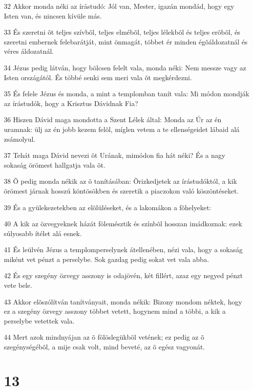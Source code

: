 \par 32 Akkor monda néki az írástudó: Jól van, Mester, igazán mondád, hogy egy Isten van, és nincsen kívüle más.
\par 33 És szeretni õt teljes szívbõl, teljes elmébõl, teljes lélekbõl és teljes erõbõl, és szeretni embernek felebarátját, mint önmagát, többet ér minden égõáldozatnál és véres áldozatnál.
\par 34 Jézus pedig látván, hogy bölcsen felelt vala, monda néki: Nem messze vagy az Isten országától. És többé senki sem meri vala õt megkérdezni.
\par 35 És felele Jézus és monda, a mint a templomban tanít vala: Mi módon mondják az írástudók, hogy a Krisztus Dávidnak Fia?
\par 36 Hiszen Dávid maga mondotta a  Szent Lélek által: Monda az Úr az én uramnak: ülj az én jobb kezem felõl, míglen vetem a te ellenségeidet lábaid alá zsámolyul.
\par 37 Tehát maga Dávid nevezi õt Urának, mimódon fia hát néki? És a nagy sokaság örömest hallgatja vala õt.
\par 38 Õ pedig monda nékik az õ tanításában: Õrizkedjetek az írástudóktól, a kik örömest járnak hosszú köntösökben és szeretik a piaczokon való köszöntéseket.
\par 39 És a gyülekezetekben az elõlüléseket, és a lakomákon a fõhelyeket:
\par 40 A kik az özvegyeknek házát fölemésztik és színbõl hosszan imádkoznak: ezek súlyosabb ítélet alá esnek.
\par 41 És leülvén Jézus a templomperselynek átellenében, nézi vala, hogy a sokaság miként vet pénzt a perselybe. Sok gazdag pedig sokat vet vala abba.
\par 42 És egy szegény özvegy asszony is odajövén, két fillért, azaz egy negyed pénzt vete bele.
\par 43 Akkor elõszólítván tanítványait, monda nékik: Bizony mondom néktek, hogy ez a szegény özvegy asszony többet vetett, hogynem mind a többi, a kik a perselybe vetettek vala.
\par 44 Mert azok mindnyájan az õ fölöslegükbõl vetének; ez pedig az õ szegénységébõl, a mije csak volt, mind beveté, az õ egész vagyonát.

\chapter{13}

